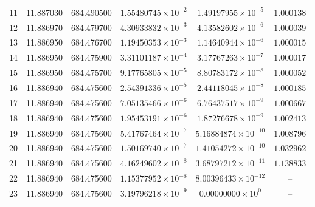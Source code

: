 \documentclass[11pt, a4paper]{article}
\theoremstyle{definition}
\begin{document}
\begin{table}[h!]
\begin{tabular}{cccccc}
11  &  11.887030  & 684.490500  & $1.55480745\times 10^{-2}$ & $1.49197955\times 10^{-5}$ & $1.000138$ \\
12  &  11.886970  & 684.479700  & $4.30933832\times 10^{-3}$ & $4.13582602\times 10^{-6}$ & $1.000039$ \\
13  &  11.886950  & 684.476700  & $1.19450353\times 10^{-3}$ & $1.14640944\times 10^{-6}$ & $1.000015$ \\
14  &  11.886950  & 684.475900  & $3.31101187\times 10^{-4}$ & $3.17767263\times 10^{-7}$ & $1.000017$ \\
15  &  11.886950  & 684.475700  & $9.17765805\times 10^{-5}$ & $8.80783172\times 10^{-8}$ & $1.000052$ \\
16  &  11.886940  & 684.475600  & $2.54391336\times 10^{-5}$ & $2.44118045\times 10^{-8}$ & $1.000185$ \\
17  &  11.886940  & 684.475600  & $7.05135466\times 10^{-6}$ & $6.76437517\times 10^{-9}$ & $1.000667$ \\
18  &  11.886940  & 684.475600  & $1.95453191\times 10^{-6}$ & $1.87276678\times 10^{-9}$ & $1.002413$ \\
19  &  11.886940  & 684.475600  & $5.41767464\times 10^{-7}$ & $5.16884874\times 10^{-10}$ & $1.008796$ \\
20  &  11.886940  & 684.475600  & $1.50169740\times 10^{-7}$ & $1.41054272\times 10^{-10}$ & $1.032962$ \\
21  &  11.886940  & 684.475600  & $4.16249602\times 10^{-8}$ & $3.68797212\times 10^{-11}$ & $1.138833$ \\
22  &  11.886940  & 684.475600  & $1.15377952\times 10^{-8}$ & $8.00396433\times 10^{-12}$ & -- \\
23  &  11.886940  & 684.475600  & $3.19796218\times 10^{-9}$ & $0.00000000\times 10^{0}$ & -- \\
\hline
\end{tabular}
\end{table}
\end{document}
